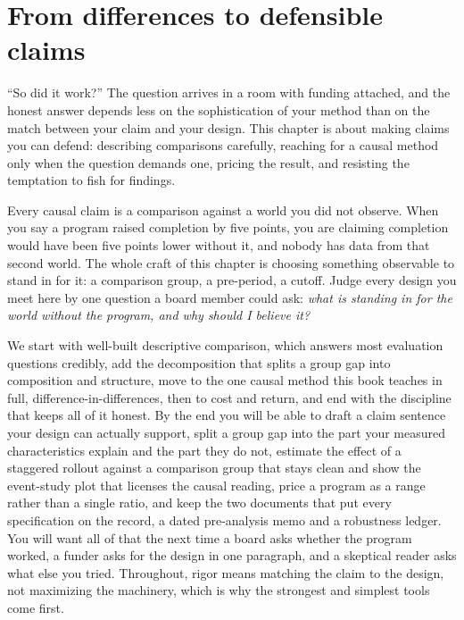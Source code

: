 \documentclass[
    a4paper,
    fontsize=10pt,
    twoside=true,
    numbers=noenddot,
]{kaobook}
\begin{document}
\chapter{From differences to defensible claims}\label{ch:claims}

\enquote{So did it work?} The question arrives in a room with funding attached, and the honest answer depends less on the sophistication of your method than on the match between your claim and your design. This chapter is about making claims you can defend: describing comparisons carefully, reaching for a causal method only when the question demands one, pricing the result, and resisting the temptation to fish for findings.

Every causal claim is a comparison against a world you did not observe. When you say a program raised completion by five points, you are claiming completion would have been five points lower without it, and nobody has data from that second world. The whole craft of this chapter is choosing something observable to stand in for it: a comparison group, a pre-period, a cutoff. Judge every design you meet here by one question a board member could ask: \emph{what is standing in for the world without the program, and why should I believe it?}

We start with well-built descriptive comparison, which answers most evaluation questions credibly, add the decomposition that splits a group gap into composition and structure, move to the one causal method this book teaches in full, difference-in-differences, then to cost and return, and end with the discipline that keeps all of it honest. By the end you will be able to draft a claim sentence your design can actually support, split a group gap into the part your measured characteristics explain and the part they do not, estimate the effect of a staggered rollout against a comparison group that stays clean and show the event-study plot that licenses the causal reading, price a program as a range rather than a single ratio, and keep the two documents that put every specification on the record, a dated pre-analysis memo and a robustness ledger. You will want all of that the next time a board asks whether the program worked, a funder asks for the design in one paragraph, and a skeptical reader asks what else you tried. Throughout, rigor means matching the claim to the design, not maximizing the machinery, which is why the strongest and simplest tools come first.
\end{document}
